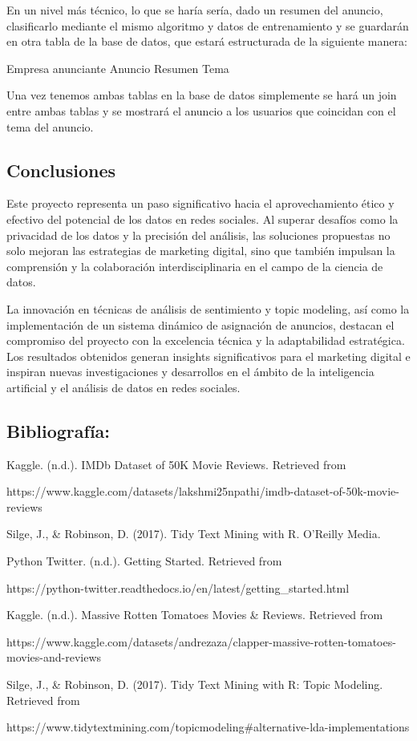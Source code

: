 \documentclass[
  letterpaper,
  DIV=11,
  numbers=noendperiod]{scrartcl}
\begin{document}
En un nivel más técnico, lo que se haría sería, dado un resumen del
anuncio, clasificarlo mediante el mismo algoritmo y datos de
entrenamiento y se guardarán en otra tabla de la base de datos, que
estará estructurada de la siguiente manera:

Empresa anunciante \textbar{} Anuncio \textbar{} Resumen \textbar{} Tema
\textbar{}

Una vez tenemos ambas tablas en la base de datos simplemente se hará un
join entre ambas tablas y se mostrará el anuncio a los usuarios que
coincidan con el tema del anuncio.

\subsection{Conclusiones}\label{conclusiones}

Este proyecto representa un paso significativo hacia el aprovechamiento
ético y efectivo del potencial de los datos en redes sociales. Al
superar desafíos como la privacidad de los datos y la precisión del
análisis, las soluciones propuestas no solo mejoran las estrategias de
marketing digital, sino que también impulsan la comprensión y la
colaboración interdisciplinaria en el campo de la ciencia de datos.

La innovación en técnicas de análisis de sentimiento y topic modeling,
así como la implementación de un sistema dinámico de asignación de
anuncios, destacan el compromiso del proyecto con la excelencia técnica
y la adaptabilidad estratégica. Los resultados obtenidos generan
insights significativos para el marketing digital e inspiran nuevas
investigaciones y desarrollos en el ámbito de la inteligencia artificial
y el análisis de datos en redes sociales.

\newpage{}

\subsection{Bibliografía:}\label{bibliografuxeda}

Kaggle. (n.d.). IMDb Dataset of 50K Movie Reviews. Retrieved from

https://www.kaggle.com/datasets/lakshmi25npathi/imdb-dataset-of-50k-movie-reviews

Silge, J., \& Robinson, D. (2017). Tidy Text Mining with R. O'Reilly
Media.

Python Twitter. (n.d.). Getting Started. Retrieved from

https://python-twitter.readthedocs.io/en/latest/getting\_started.html

Kaggle. (n.d.). Massive Rotten Tomatoes Movies \& Reviews. Retrieved
from

https://www.kaggle.com/datasets/andrezaza/clapper-massive-rotten-tomatoes-movies-and-reviews

Silge, J., \& Robinson, D. (2017). Tidy Text Mining with R: Topic
Modeling. Retrieved from

https://www.tidytextmining.com/topicmodeling\#alternative-lda-implementations
\end{document}
